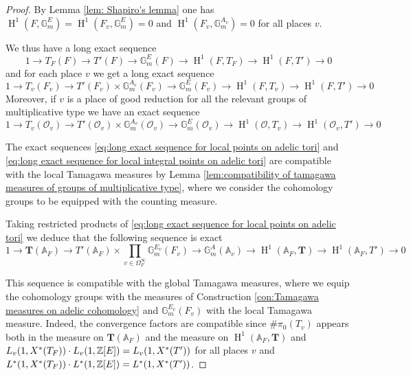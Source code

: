 \documentclass[a4paper,11pt,reqno]{amsart}
\newcommand{\G}{\mathbb{G}}
\newcommand{\A}{\mathbb{A}}
\DeclareMathOperator{\HH}{H}
\theoremstyle{definition}
\begin{document}
\begin{proof}
	By Lemma \ref{lem: Shapiro's lemma} one has $\HH^1(F, \G_m^E) = \HH^1(F_v, \G_m^E)= 0$ and $\HH^1(F_v, \G_m^{A_v}) = 0$ for all places $v$. 
	
	We thus have a long exact sequence
	\begin{equation}\label{eq:long exact sequence for global points on adelic tori}
		1 \to T_F(F) \to T'(F) \to \G_m^E(F) \to \HH^1(F, T_F) \to \HH^1(F, T') \to 0
	\end{equation}
	and for each place $v$ we get a long exact sequence
	\begin{equation}\label{eq:long exact sequence for local points on adelic tori}
		1 \to T_v(F_v) \to T'(F_v) \times \G_m^{A_v}(F_v) \to \G_m^{E}(F_v) \to \HH^1(F, T_v) \to \HH^1(F, T') \to 0
	\end{equation}
	Moreover, if $v$ is a place of good reduction for all the relevant groups of multiplicative type we have an exact sequence
	\begin{equation}\label{eq:long exact sequence for local integral points on adelic tori}
		1 \to T_v(\mathcal{O}_v) \to T'(\mathcal{O}_v) \times \G_m^{A_v}(\mathcal{O}_v) \to \G_m^{E}(\mathcal{O}_v) \to \HH^1(\mathcal{O}, T_v) \to \HH^1(\mathcal{O}_v, T') \to 0
	\end{equation}
	
	The exact sequences \eqref{eq:long exact sequence for local points on adelic tori} and \eqref{eq:long exact sequence for local integral points on adelic tori} are compatible with the local Tamagawa measures by Lemma \ref{lem:compatibility of tamagawa measures of groups of multiplicative type}, where we consider the cohomology groups to be equipped with the counting measure. 
	
	Taking restricted products of \eqref{eq:long exact sequence for local points on adelic tori} we deduce that the following sequence is exact
	\begin{equation}\label{eq:long exact sequence for adelic points on adelic tori}
		1 \to \mathbf{T}(\A_F) \to T'(\A_F) \times \prod_{v \in \Omega_F^{\infty}} \G_m^{E_v}(F_v) \to \G_m^{A}(\A_v) \to \HH^1(\A_F, \mathbf{T}) \to \HH^1(\A_F, T') \to 0
	\end{equation}
	
	This sequence is compatible with the global Tamagawa measures, where we equip the cohomology groups with the measures of Construction \ref{con:Tamagawa measures on adelic cohomology} and $\G_m^{E_v}(F_v)$ with the local Tamagawa measure. Indeed, the convergence factors are compatible since $\# \pi_0(T_v)$ appears both in the measure on $\mathbf{T}(\A_F)$ and the measure on $\HH^1(\A_F, \mathbf{T})$ and $L_v(1, X^*(T_F)) \cdot L_v(1, \mathbb{Z}[E]) = L_v(1, X^*(T'))$ for all places $v$ and $L^*(1, X^*(T_F)) \cdot L^*(1, \mathbb{Z}[E]) = L^*(1, X^*(T'))$.
	

\end{proof}
\end{document}
